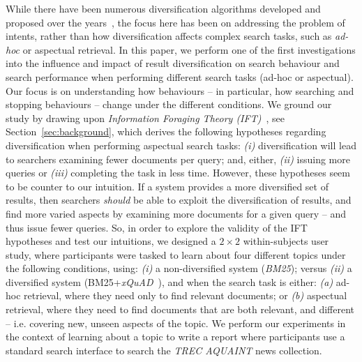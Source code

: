 While there have been numerous diversification algorithms developed and proposed over the years~\cite{carbonell1998mmr,chen2006lessismore,santos2010query_reformulations_diversification,santos2011intent,zhai2015subtopics}, the focus here has been on addressing the problem of intents, rather than how diversification affects complex search tasks, such as \emph{ad-hoc} or aspectual retrieval. In this paper, we perform one of the first investigations into the influence and impact of result diversification on search behaviour and search performance when performing different search tasks (ad-hoc or aspectual). Our focus is on understanding how behaviours -- in particular, how searching and stopping behaviours -- change under the different conditions. We ground our study by drawing upon \emph{Information Foraging Theory (IFT)}~\cite{pirolli1999ift}, see Section~\ref{sec:background}, which derives the following hypotheses regarding diversification when performing aspectual search tasks: \emph{(i)} diversification will lead to searchers examining fewer documents per query; and, either, \emph{(ii)} issuing more queries or \emph{(iii)} completing the task in less time. However, these hypotheses seem to be counter to our intuition. If a system provides a more diversified set of results, then searchers \emph{should} be able to exploit the diversification of results, and find more varied aspects by examining more documents for a given query -- and thus issue fewer queries. So, in order to explore the validity of the IFT hypotheses and test our intuitions, we designed a $2 \times 2$ within-subjects user study, where participants were tasked to learn about four different topics under the following conditions, using: \emph{(i)} a non-diversified system (\emph{BM25}); versus \emph{(ii)} a diversified system (BM25+\emph{xQuAD}~\cite{santos2010query_reformulations_diversification}), and when the search task is either: \emph{(a)} ad-hoc retrieval, where they need only to find relevant documents; or \emph{(b)} aspectual retrieval, where they need to find documents that are both relevant, and different -- i.e. covering new, unseen aspects of the topic. We perform our experiments in the context of learning about a topic to write a report where participants use a standard search interface to search the \emph{TREC AQUAINT} news collection. 

